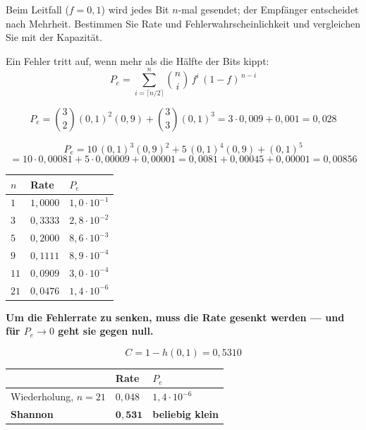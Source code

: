\begin{aufgabe}
Beim Leitfall ($f=0{,}1$) wird jedes Bit $n$-mal gesendet; der Empfänger entscheidet nach Mehrheit. Bestimmen Sie Rate und Fehlerwahrscheinlichkeit und vergleichen Sie mit der Kapazität.

\loesung
{}
Ein Fehler tritt auf, wenn mehr als die Hälfte der Bits kippt:
\[ P_e = \sum_{i=\lceil n/2\rceil}^{n} \binom{n}{i}\,f^{i}\,(1-f)^{\,n-i} \]

\[ P_e = \binom32 (0{,}1)^2(0{,}9) + \binom33 (0{,}1)^3 = 3\cdot0{,}009 + 0{,}001 = 0{,}028 \]

\[ P_e = 10\,(0{,}1)^3(0{,}9)^2 + 5\,(0{,}1)^4(0{,}9) + (0{,}1)^5 \]
\[ = 10\cdot0{,}00081 + 5\cdot0{,}00009 + 0{,}00001 = 0{,}0081+0{,}00045+0{,}00001 = 0{,}00856 \]

\begin{center}
{\small
\renewcommand{\arraystretch}{1.48}
\begin{tabular}{@{}P{1.4cm}P{2.0cm}P{2.4cm}@{}}
\toprule
$n$ & \textbf{Rate} & $P_e$\\
\midrule
$1$ & $1{,}0000$ & $1{,}0\cdot10^{-1}$\\
$3$ & $0{,}3333$ & $2{,}8\cdot10^{-2}$\\
$5$ & $0{,}2000$ & $8{,}6\cdot10^{-3}$\\
$9$ & $0{,}1111$ & $8{,}9\cdot10^{-4}$\\
$11$ & $0{,}0909$ & $3{,}0\cdot10^{-4}$\\
$21$ & $0{,}0476$ & $1{,}4\cdot10^{-6}$\\
\bottomrule
\end{tabular}}
\end{center}

\begin{center}
\begin{minipage}{0.9\textwidth}
\textbf{Um die Fehlerrate zu senken, muss die Rate gesenkt werden --- und für $P_e \to 0$ geht sie gegen null.}
\end{minipage}
\end{center}

\[ C = 1-h(0{,}1) = 0{,}5310 \]

\begin{center}
\renewcommand{\arraystretch}{1.48}
\begin{tabular}{@{}P{2.8cm}P{2.2cm}P{2.4cm}@{}}
\toprule
& \textbf{Rate} & $P_e$\\
\midrule
Wiederholung, $n=21$ & $0{,}048$ & $1{,}4\cdot10^{-6}$\\
\textbf{Shannon} & $\mathbf{0{,}531}$ & \textbf{beliebig klein}\\
\bottomrule
\end{tabular}
\end{center}


\end{aufgabe}
